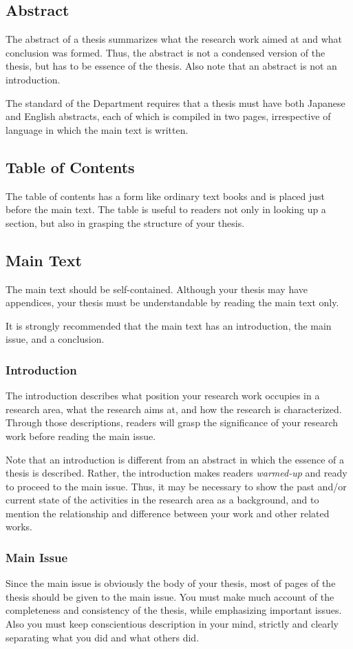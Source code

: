 \documentclass[master,english]{kuisthesis}
\begin{document}
\subsection{Abstract}\label{subsec-abstract}
The abstract of a thesis summarizes what the research work aimed at and what
conclusion was formed.  Thus, the abstract is not a condensed version of the
thesis, but has to be essence of the thesis.  Also note that an abstract
is not an introduction.

The standard of the Department requires that a thesis must have both
Japanese and English abstracts, each of which is compiled in two pages,
irrespective of language in which the main text is written.

\subsection{Table of Contents}\label{subsec-toc}
The table of contents has a form like ordinary text books and is placed just
before the main text.  The table is useful to readers not only in looking up
a section, but also in grasping the structure of your thesis.

\subsection{Main Text}\label{subsec-main}
The main text should be self-contained.  Although your thesis may have
appendices, your thesis must be understandable by reading the main text
only.

It is strongly recommended that the main text has an introduction, the main
issue, and a conclusion.

\subsubsection{Introduction}\label{subsubsec-intro}
The introduction describes what position your research work occupies in a
research area, what the research aims at, and how the research is
characterized.   Through those descriptions, readers will grasp the
significance of your research work before reading the main issue.

Note that an introduction is different from an abstract in which the essence
of a thesis is described.  Rather, the introduction makes readers {\em
warmed-up} and ready to proceed to the main issue.  Thus, it may be
necessary to show the past and/or current state of the activities in the
research area as a background, and to mention the relationship and
difference between your work and other related works.

\subsubsection{Main Issue}\label{subsubsec-main}
Since the main issue is obviously the body of your thesis, most of pages of
the thesis should be given to the main issue.  You must make much account of
the completeness and consistency of the thesis, while emphasizing important
issues.  Also you must keep conscientious description in your mind, strictly
and clearly separating what you did and what others did.
\end{document}
